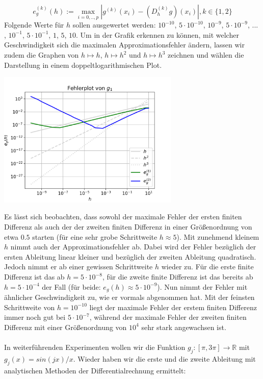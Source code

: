 \documentclass{scrartcl}
\newcommand{\abs}[1]{\left\lvert#1\right\rvert}
\begin{document}
\[e_g^{(k)}(h):=\max_{i=0,..,p}\abs{g^{(k)}(x_i)-(D_h^{(k)}g)(x_i)} , k \in \lbrace1, 2\rbrace\]
Folgende Werte für $h$ sollen ausgewertet werden: $10^{-10}$, $5 \cdot 10^{-10}$, $10^{-9}$, $5 \cdot 10^{-9}$, ... , $10^{-1}$, \linebreak  $5 \cdot 10^{-1}$, $1$, $5$, $10$.
Um in der Grafik erkennen zu können, mit welcher Geschwindigkeit sich die maximalen Approximationsfehler ändern, lassen wir zudem die Graphen von $h \mapsto h$, $h \mapsto h^{2}$ und $h \mapsto h^{3}$ zeichnen und wählen die Darstellung in einem doppeltlogarithmischen Plot.
\begin{center}
	\includegraphics[width=0.65\textwidth]{Grafiken/Fehlerplot_Aufgabe2}
  \vspace{-0.2cm}
  \vspace{0.5cm}
\end{center}
Es lässt sich beobachten, dass sowohl der maximale Fehler der ersten finiten Differenz als auch der der zweiten finiten Differenz in einer Größenordnung von etwa $0.5$ starten (für eine sehr grobe Schrittweite $h \approx 5$). Mit zunehmend kleinem $h$ nimmt auch der Approximationsfehler ab. Dabei wird der Fehler bezüglich der ersten Ableitung linear kleiner und bezüglich der zweiten Ableitung quadratisch. Jedoch nimmt er ab einer gewissen Schrittweite $h$ wieder zu. Für die erste finite Differenz ist das ab $h = 5\cdot10^{-8}$, für die zweite finite Differenz ist das bereits ab $h = 5 \cdot 10^{-4}$ der Fall (für beide: $e_g(h) \approx  5 \cdot 10^{-9}$). Nun nimmt der Fehler mit ähnlicher Geschwindigkeit zu, wie er vormals abgenommen hat. Mit der feinsten Schrittweite von $h = 10^{-10}$ liegt der maximale Fehler der erstem finiten Differenz immer noch gut bei $5 \cdot 10^{-7}$, während der maximale Fehler der zweiten finiten Differenz mit einer Größenordnung von $10^{4}$ sehr stark angewachsen ist. \\
 \\
In weiterführenden Experimenten wollen wir die Funktion $g_j:[\pi, 3\pi] \rightarrow \mathbb{R}$ mit $g_j(x) = sin(j x)/x$. Wieder haben wir die erste und die zweite Ableitung mit analytischen Methoden der Differentialrechnung ermittelt:
\end{document}
